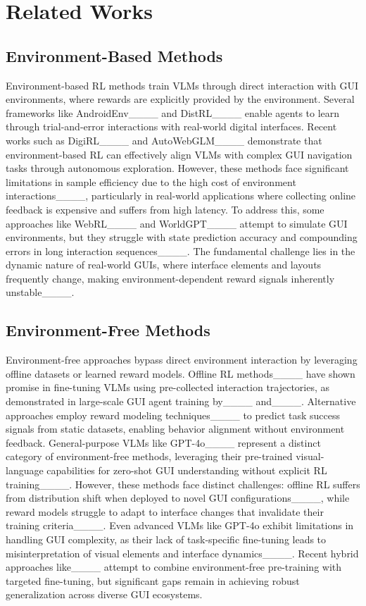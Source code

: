 \section{Related Works}
\subsection{Environment-Based Methods}
Environment-based RL methods train VLMs through direct interaction with GUI environments, where rewards are explicitly provided by the environment. Several frameworks like AndroidEnv____ and DistRL____ enable agents to learn through trial-and-error interactions with real-world digital interfaces. Recent works such as DigiRL____ and AutoWebGLM____ demonstrate that environment-based RL can effectively align VLMs with complex GUI navigation tasks through autonomous exploration. However, these methods face significant limitations in sample efficiency due to the high cost of environment interactions____, particularly in real-world applications where collecting online feedback is expensive and suffers from high latency. To address this, some approaches like WebRL____ and WorldGPT____ attempt to simulate GUI environments, but they struggle with state prediction accuracy and compounding errors in long interaction sequences____. The fundamental challenge lies in the dynamic nature of real-world GUIs, where interface elements and layouts frequently change, making environment-dependent reward signals inherently unstable____.

\subsection{Environment-Free Methods}
Environment-free approaches bypass direct environment interaction by leveraging offline datasets or learned reward models. Offline RL methods____ have shown promise in fine-tuning VLMs using pre-collected interaction trajectories, as demonstrated in large-scale GUI agent training by____ and____. Alternative approaches employ reward modeling techniques____ to predict task success signals from static datasets, enabling behavior alignment without environment feedback. General-purpose VLMs like GPT-4o____ represent a distinct category of environment-free methods, leveraging their pre-trained visual-language capabilities for zero-shot GUI understanding without explicit RL training____. However, these methods face distinct challenges: offline RL suffers from distribution shift when deployed to novel GUI configurations____, while reward models struggle to adapt to interface changes that invalidate their training criteria____. Even advanced VLMs like GPT-4o exhibit limitations in handling GUI complexity, as their lack of task-specific fine-tuning leads to misinterpretation of visual elements and interface dynamics____. Recent hybrid approaches like____ attempt to combine environment-free pre-training with targeted fine-tuning, but significant gaps remain in achieving robust generalization across diverse GUI ecosystems.

